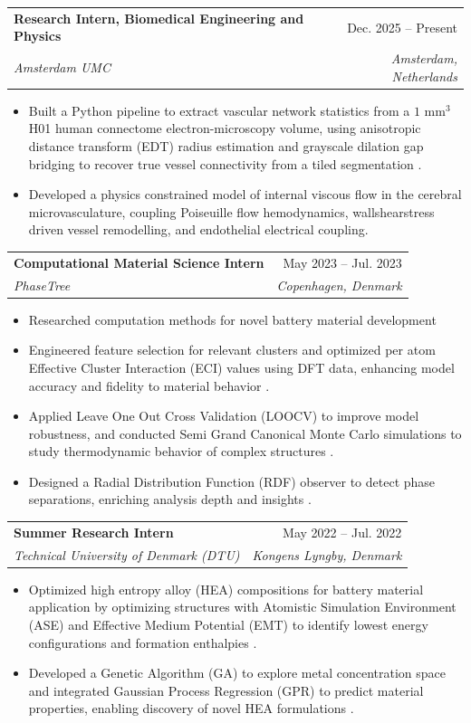 \documentclass[letterpaper,11pt]{article}
\makeatletter
\newcommand{\resumeItem}[1]{
  \item\small{
    {#1 \vspace{-2pt}}
  }
}
\newcommand{\resumeSubheading}[4]{
  \vspace{-2pt}\item
    \begin{tabular*}{0.97\textwidth}[t]{l@{\extracolsep{\fill}}r}
      \textbf{#1} & #2 \\
      \textit{\small#3} & \textit{\small #4} \\
    \end{tabular*}\vspace{-7pt}
}
\newcommand{\resumeItemListStart}{\begin{itemize}}
\newcommand{\resumeItemListEnd}{\end{itemize}\vspace{-5pt}}
\makeatother
\begin{document}
    \resumeSubheading
      {Research Intern, Biomedical Engineering and Physics}{Dec. 2025 -- Present}
      {Amsterdam UMC}{Amsterdam, Netherlands}
      \resumeItemListStart
        \resumeItem{Built a Python pipeline to extract vascular network statistics from a $1\text{ mm}^{3}$ H01 human connectome electron-microscopy volume, using anisotropic distance transform (EDT) radius estimation and grayscale dilation gap bridging to recover true vessel connectivity from a tiled segmentation .}
        \resumeItem{Developed a physics constrained model of internal viscous flow in the 
    cerebral microvasculature, coupling Poiseuille flow hemodynamics, 
    wallshearstress driven vessel remodelling, and endothelial electrical 
    coupling.}
      \resumeItemListEnd

    \resumeSubheading
      {Computational Material Science Intern}{May 2023 -- Jul. 2023}
      {PhaseTree}{Copenhagen, Denmark}
      \resumeItemListStart
        \resumeItem{Researched computation methods for novel battery material development}
        \resumeItem{Engineered feature selection for relevant clusters and optimized per atom Effective Cluster Interaction (ECI) values using DFT data, enhancing model accuracy and fidelity to material behavior .}
        \resumeItem{Applied Leave One Out Cross Validation (LOOCV) to improve model robustness, and conducted Semi Grand Canonical Monte Carlo simulations to study thermodynamic behavior of complex structures .}
        \resumeItem{Designed a Radial Distribution Function (RDF) observer to detect phase separations, enriching analysis depth and insights .}
      \resumeItemListEnd

    \resumeSubheading
      {Summer Research Intern}{May 2022 -- Jul. 2022}
      {Technical University of Denmark (DTU)}{Kongens Lyngby, Denmark}
      \resumeItemListStart
        \resumeItem{Optimized high entropy alloy (HEA) compositions for battery material application by optimizing structures with Atomistic Simulation Environment (ASE) and Effective Medium Potential (EMT) to identify lowest energy configurations and formation enthalpies .}
        \resumeItem{Developed a Genetic Algorithm (GA) to explore metal concentration space and integrated Gaussian Process Regression (GPR) to predict material properties, enabling discovery of novel HEA formulations .}
      \resumeItemListEnd
\end{document}
